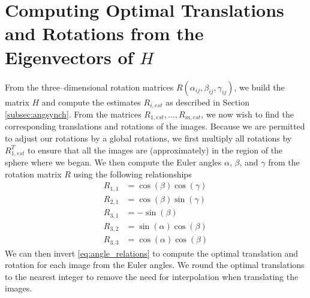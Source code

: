 \documentclass[11pt]{article}
\begin{document}
\section{Computing Optimal Translations and Rotations from the Eigenvectors of $H$}

From the three--dimensional rotation matrices $R(\alpha_{ij}, \beta_{ij}, \gamma_{ij})$,
we build the matrix $H$ and compute the estimates $R_{i, est}$ as described in Section \ref{subsec:angsynch}.
%
From the matrices $R_{1, est}, \dots, R_{m, est}$, we now wish to find the corresponding translations and rotations of the images.
%
Because we are permitted to adjust our rotations by a global rotations, we first multiply all rotations by $R_{1, est}^T$ to ensure that all the images are (approximately) in the region of the sphere where we began.
%
We then compute the Euler angles $\alpha$, $\beta$, and $\gamma$ from the rotation matrix $R$ using the following relationships
\begin{equation}
\begin{aligned}
R_{1,1} & = \cos(\beta)\cos(\gamma) \\
R_{2,1} & = \cos(\beta)\sin(\gamma) \\
R_{3,1} & = -\sin(\beta) \\
R_{3,2} & = \sin(\alpha)\cos(\beta) \\
R_{3,3} & = \cos(\alpha)\cos(\beta) 
\end{aligned}
\end{equation}
%
We can then invert \eqref{eq:angle_relations} to compute the optimal translation and rotation for each image from the Euler angles.
%
We round the optimal translations to the nearest integer to remove the need for interpolation when translating the images. 



\end{document}
